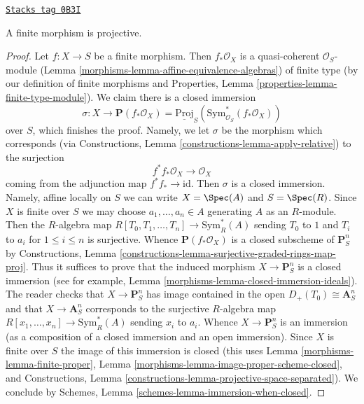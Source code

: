 \begin{lemma}
\label{morphisms-lemma-finite-projective}
\href{https://stacks.math.columbia.edu/tag/0B3I}{\texttt{Stacks tag 0B3I}}

A finite morphism is projective.
\end{lemma}

\begin{proof}

Let $f : X \to S$ be a finite morphism. Then $f_*\mathcal{O}_X$ is
a quasi-coherent $\mathcal{O}_S$-module
(Lemma \ref{morphisms-lemma-affine-equivalence-algebras})
of finite type
(by our definition of finite morphisms and
Properties, Lemma \ref{properties-lemma-finite-type-module}).
We claim there is a closed immersion
$$
\sigma :
X
\longrightarrow
\mathbf{P}(f_*\mathcal{O}_X) =
\underline{\text{Proj}}_S(\text{Sym}^*_{\mathcal{O}_S}(f_*\mathcal{O}_X))
$$
over $S$, which finishes
the proof. Namely, we let $\sigma$ be the morphism which corresponds
(via Constructions, Lemma \ref{constructions-lemma-apply-relative})
to the surjection
$$
f^*f_*\mathcal{O}_X \longrightarrow \mathcal{O}_X
$$
coming from the adjunction map $f^*f_* \to \text{id}$. Then $\sigma$
is a closed immersion. Namely, affine locally on $S$ we can write
$X = \Spec(A)$ and $S = \Spec(R)$. Since $X$ is finite over $S$
we may choose $a_1, \ldots, a_n \in A$ generating $A$ as an $R$-module.
Then the $R$-algebra map $R[T_0, T_1, \ldots, T_n] \to \text{Sym}_R^*(A)$
sending $T_0$ to $1$ and $T_i$ to $a_i$ for $1 \leq i \leq n$ is surjective.
Whence $\mathbf{P}(f_*\mathcal{O}_X)$ is a closed subscheme of
$\mathbf{P}^n_S$ by Constructions, Lemma
\ref{constructions-lemma-surjective-graded-rings-map-proj}.
Thus it suffices to prove that the induced morphism
$X \to \mathbf{P}^n_S$ is a closed immersion
(see for example, Lemma \ref{morphisms-lemma-closed-immersion-ideals}).
The reader checks that $X \to \mathbf{P}^n_S$ has image contained
in the open $D_+(T_0) \cong \mathbf{A}^n_S$ and that $X \to \mathbf{A}^n_S$
corresponds to the surjective $R$-algebra map
$R[x_1, \ldots, x_n] \to \text{Sym}_R^*(A)$ sending $x_i$ to $a_i$.
Whence $X \to \mathbf{P}^n_S$ is an immersion (as a composition
of a closed immersion and an open immersion). Since
$X$ is finite over $S$ the image of this immersion is closed
(this uses Lemma \ref{morphisms-lemma-finite-proper},
Lemma \ref{morphisms-lemma-image-proper-scheme-closed}, and
Constructions, Lemma \ref{constructions-lemma-projective-space-separated}).
We conclude by Schemes, Lemma \ref{schemes-lemma-immersion-when-closed}.
\end{proof}

